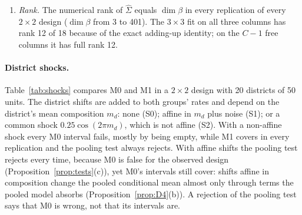 \begin{enumerate}
of $B$ narrows CLR by 0.06--0.10 in the $3\times3$ design and 0.06--0.19 in the
$2\times2$ M1 designs. The Bhatia--Davis allowance narrows CLR for $B$ from 0.086 to
0.057 in the boundary design C; where the plausible rates include 0.5 it equals
Popoviciu's and is up to 0.015 wider, because part of $\alpha$ is spent on $\bar m$.
The projection interval for $B$ with the proved allowance of
Proposition~\ref{prop:bd} differs in width by at most 0.002 from the version with a
CLR input, and its coverage is the same in every design.
\item \emph{Rank.} The numerical rank of $\hat\Sigma$ equals $\dim\beta$ in every
replication of every $2\times2$ design ($\dim\beta$ from 3 to 401). The $3\times3$
fit on all three columns has rank 12 of 18 because of the exact adding-up identity;
on the $C-1$ free columns it has full rank 12.
\end{enumerate}

\paragraph{District shocks.} Table~\ref{tab:shocks} compares M0 and M1 in a
$2\times2$ design with 20 districts of 50 units. The district shifts are added to
both groups' rates and depend on the district's mean composition $m_d$: none (S0);
affine in $m_d$ plus noise (S1); or a common shock $0.25\cos(2\pi m_d)$, which is not
affine (S2). With a non-affine shock every M0 interval fails, mostly by being empty,
while M1 covers in every replication and the pooling test always rejects. With
affine shifts the pooling test rejects every time, because M0 is false for the
observed design (Proposition~\ref{prop:tests}(c)), yet M0's intervals still cover:
shifts affine in composition change the pooled conditional mean almost only
through terms the pooled model absorbs (Proposition~\ref{prop:D4}(b)). A rejection
of the pooling test says that M0 is wrong, not that its intervals are.

